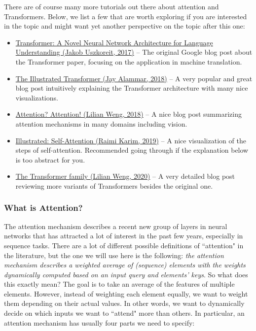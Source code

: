 There are of course many more tutorials out there about attention and Transformers. Below, we list a few that are worth exploring if you are interested in the topic
and might want yet another perspective on the topic after this one:
\begin{itemize}
    \item \href{https://ai.googleblog.com/2017/08/transformer-novel-neural-network.html}{Transformer: A Novel Neural Network Architecture for Language Understanding (Jakob Uszkoreit, 2017)} -- The original Google blog post about the Transformer paper, focusing on the application in machine translation.
    \item \href{http://jalammar.github.io/illustrated-transformer/}{The Illustrated Transformer (Jay Alammar, 2018)} -- A very popular and great blog post intuitively explaining the Transformer architecture with many nice visualizations.
    \item \href{https://lilianweng.github.io/lil-log/2018/06/24/attention-attention.html}{Attention? Attention!
(Lilian Weng, 2018)} -- A nice blog post summarizing attention mechanisms in many domains including vision.
    \item \href{https://towardsdatascience.com/illustrated-self-attention-2d627e33b20a}{Illustrated: Self-Attention (Raimi Karim, 2019)} -- A nice visualization of the steps of self-attention.
Recommended going through if the explanation below is too abstract for you.
    \item \href{https://lilianweng.github.io/lil-log/2020/04/07/the-transformer-family.html}{The Transformer family (Lilian Weng, 2020)} -- A very detailed blog post reviewing more variants of Transformers besides the original one.
\end{itemize}



\subsubsection{What is Attention?}

The attention mechanism describes a recent new group of layers in neural networks that has attracted
a lot of interest in the past few years, especially in sequence tasks. There are a lot of different possible definitions of ``attention" in the literature, but the one we will use here is the following: \emph{the attention mechanism describes a weighted average of (sequence) elements with the weights dynamically computed based on an input query and elements' keys}.
So what does this exactly mean? The goal is to take an average of the features of multiple elements. However, instead of weighting each element equally, we want to weight them depending on their actual values.
In other words, we want to dynamically decide on which inputs we want to ``attend" more than others. In particular, an attention mechanism has usually four parts we need to specify:


